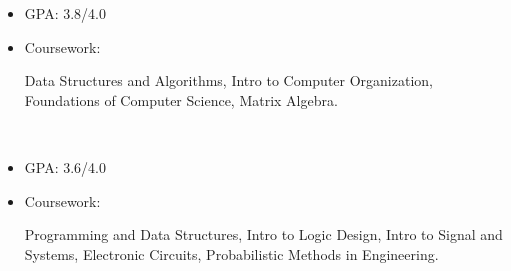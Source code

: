 \newcommand{\TUBentry}{
    \TUB
    \poswithprd{Introduction to 3D Scanning and Printing at TUB Winter University}{Jan 2018-Feb 2018}
    \begin{itemize}
        \item 
        Learned the basic of 3D scanning \& printing. Learned Blender for 3D modeling.
    \end{itemize}
}



\UM
{}
\begin{itemize}
    \item GPA: 3.8/4.0
    \item Coursework: 
    \begin{minipage}[t]{\courseworkwidth}
        Data Structures and Algorithms,
        Intro to Computer Organization,
        Foundations of Computer Science,
        Matrix Algebra.
    \end{minipage}\\
\end{itemize}

\JI
{}
\begin{itemize}
    \item GPA: 3.6/4.0
    \item Coursework:
    \begin{minipage}[t]{\courseworkwidth}
        Programming and Data Structures,
        Intro to Logic Design,
        Intro to Signal and Systems,
        Electronic Circuits,
        Probabilistic Methods in Engineering.
    \end{minipage}\\
\end{itemize}